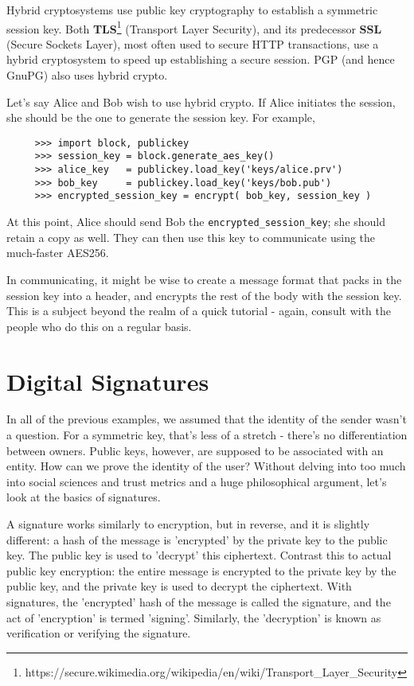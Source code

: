 \documentclass[letterpaper,10pt]{article}
\begin{document}
Hybrid cryptosystems use public key cryptography to establish a symmetric 
session key. Both \textbf{TLS}\footnote{https://secure.wikimedia.org/wikipedia/en/wiki/Transport\_Layer\_Security} 
(Transport Layer Security), and its predecessor \textbf{SSL} (Secure Sockets 
Layer), most often used to secure HTTP transactions, use a hybrid cryptosystem
to speed up establishing a secure session. PGP (and hence GnuPG) also uses
hybrid crypto.

Let's say Alice and Bob wish to use hybrid crypto. If Alice initiates the 
session, she should be the one to generate the session key. For example,
\begin{verbatim}
     >>> import block, publickey
     >>> session_key = block.generate_aes_key()
     >>> alice_key   = publickey.load_key('keys/alice.prv')
     >>> bob_key     = publickey.load_key('keys/bob.pub')
     >>> encrypted_session_key = encrypt( bob_key, session_key )
\end{verbatim}

At this point, Alice should send Bob the \verb|encrypted_session_key|; she 
should retain a copy as well. They can then use this key to communicate using
the much-faster AES256.

In communicating, it might be wise to create a message format that packs in 
the session key into a header, and encrypts the rest of the body with the
session key. This is a subject beyond the realm of a quick tutorial - again,
consult with the people who do this on a regular basis.

\section{Digital Signatures}
In all of the previous examples, we assumed that the identity of the sender
wasn't a question. For a symmetric key, that's less of a stretch - there's no 
differentiation between owners. Public keys, however, are supposed to be
associated with an entity. How can we prove the identity of the user? Without
delving into too much into social sciences and trust metrics and a huge
philosophical argument, let's look at the basics of signatures. 

A signature works similarly to encryption, but in reverse, and it is slightly
different: a hash of the message is 'encrypted' by the private key to the 
public key. The public key is used to 'decrypt' this ciphertext. Contrast this 
to actual public key encryption: the entire message is encrypted to the private 
key by the public key, and the private key is used to decrypt the ciphertext. 
With signatures, the 'encrypted' hash of the message is called the signature,
and the act of 'encryption' is termed 'signing'. Similarly, the 'decryption' 
is known as verification or verifying the signature.
\end{document}
